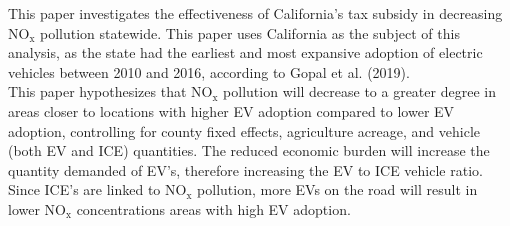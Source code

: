 \documentclass[12pt]{article}
\newcommand\tab[1][.50cm]{\hspace*{#1}}
\begin{document}
\begin{multicols}{2}
		\tab This paper investigates the effectiveness of California's tax subsidy in decreasing $\text{NO}_\text{x}$ pollution statewide. This paper uses California as the subject of this analysis, as the state had the earliest and most expansive adoption of electric vehicles between 2010 and 2016, according to Gopal et al. (2019).\\
		\tab This paper hypothesizes that $\text{NO}_\text{x}$ pollution will decrease to a greater degree in areas closer to locations with higher EV adoption compared to lower EV adoption, controlling for county fixed effects, agriculture acreage, and vehicle (both EV and ICE) quantities. The reduced economic burden will increase the quantity demanded of EV's, therefore increasing the EV to ICE vehicle ratio. Since ICE's are linked to $\text{NO}_\text{x}$ pollution, more EVs on the road will result in lower $\text{NO}_\text{x}$ concentrations areas with high EV adoption. 
		

\end{multicols}
\end{document}
